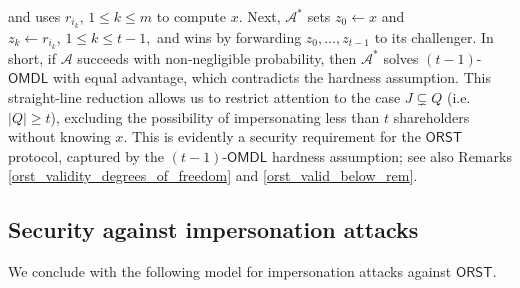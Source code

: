 \documentclass{iacrtrans}
\begin{document}
and uses $r_{i_k},\hspace{2pt} 1 \le k \le m$ to compute $x$.
Next,
$\mathcal{A}^*$ sets $z_0 \leftarrow x$
and $z_k \leftarrow r_{i_k},\hspace{2pt} 1\le k \le t-1,$
and wins by forwarding
$z_0, \dots, z_{t-1}$ to its challenger.
In short, if $\mathcal{A}$ succeeds
with non-negligible probability, then $\mathcal{A}^*$
solves $(t-1)$-$\mathsf{OMDL}$ with equal advantage,
which contradicts the hardness assumption.
This straight-line reduction allows us to restrict attention
to the case $J \subsetneq Q$ (i.e. $|Q| \ge t$),
excluding the possibility of impersonating less than $t$
shareholders without knowing $x$.
This is evidently a security requirement for the $\mathsf{ORST}$
protocol, captured by the $(t-1)$-$\mathsf{OMDL}$
hardness assumption; see also Remarks
\ref{orst_validity_degrees_of_freedom} and
\ref{orst_valid_below_rem}.

\subsection{Security against impersonation attacks}\label{section_security_imp}

\noindent
We conclude with the following model
for impersonation attacks against
$\mathsf{ORST}$.
\end{document}
